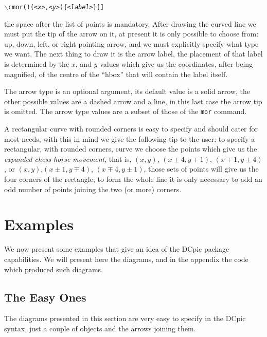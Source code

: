 \documentclass{europroc}
\begin{document}
{\small\begin{alltt}
  \(\backslash\)cmor({\em<list of points>}){\textvisiblespace}{\em<arrow direction>}({\em<x>},{\em<y>})\{{\em<label>}\}[{\em<arrow type>}]
\end{alltt}}
\noindent the space after the list of points is mandatory. After drawing the
curved line we must put the tip of the arrow on it, at present it is
only possible to choose from: up, down, left, or right pointing arrow,
and we must explicitly specify what type we want. The next thing to
draw it is the arrow label, the placement of that label is determined
by the $x$, and $y$ values which give us the coordinates, after being
magnified, of the centre of the ``hbox'' that will contain the label
itself.

The arrow type is an optional argument, its default value is a solid
arrow, the other possible values are a dashed arrow and a line, in
this last case the arrow tip is omitted. The arrow type values are a
subset of those of the {\tt mor} command.

A rectangular curve with rounded corners is easy to specify and should
cater for most needs, with this in mind we give the following tip to
the user: to specify a rectangular, with rounded corners, curve we
choose the points which give us the {\em expanded chess-horse
movement}, that is, $(x,y)$, $(x\pm4,y\mp1)$, $(x\mp1,y\pm4)$, or
$(x,y)$,$(x\pm1,y\mp4)$, $(x\mp4,y\pm1)$, those sets of points will give us
the four corners of the rectangle; to form the whole line it is only
necessary to add an odd number of points joining the two (or more)
corners.


\section{Examples}

We now present some examples that give an idea of the DCpic package
capabilities. We will present here the diagrams, and in the appendix
the code which produced such diagrams.

\subsection{The Easy Ones}

The diagrams presented in this section are very easy to specify in the
DCpic syntax, just a couple of objects and the arrows joining them.
\end{document}
